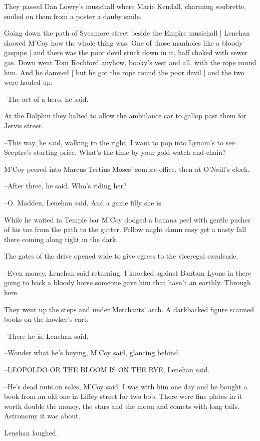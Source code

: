 They passed Dan Lowry's musichall
where Marie Kendall, charming
soubrette,
smiled on them from a poster
a dauby smile.

Going down the path of Sycamore street beside the Empire musichall |
Lenehan showed M'Coy how the whole thing was.
One of those manholes like a bloody gaspipe |
and there was the poor devil stuck down in it,
half choked with sewer gas.
Down went Tom Rochford anyhow,
booky's vest and all,
with the rope round him.
And be damned |
but he got the rope round the poor devil |
and the two were hauled up.

--The act of a hero,
he said.

At the Dolphin
they halted to allow the ambulance car to gallop past
them for Jervis street.

--This way,
he said,
walking to the right.
I want to pop into Lynam's to
see Sceptre's starting price.
What's the time by your gold watch and
chain?

M'Coy peered into Marcus Tertius Moses' sombre office,
then at
O'Neill's clock.

--After three,
he said.
Who's riding her?

--O. Madden,
Lenehan said.
And a game filly she is.

While he waited in Temple bar
M'Coy dodged a banana peel with
gentle pushes of his toe
from the path to the gutter.
Fellow might damn
easy get a nasty fall there
coming along tight in the dark.

The gates of the drive opened wide
to give egress to the viceregal
cavalcade.

--Even money,
Lenehan said returning.
I knocked against Bantam Lyons in
there
going to back a bloody horse someone gave him that hasn't an
earthly.
Through here.

They went up the steps and under Merchants' arch.
A darkbacked figure scanned books on the hawker's cart.

--There he is,
Lenehan said.

--Wonder what he's buying,
M'Coy said,
glancing behind.

--LEOPOLDO OR THE BLOOM IS ON THE RYE,
Lenehan said.

--He's dead nuts on sales,
M'Coy said.
I was with him one day
and he
bought a book from an old one in Liffey street for two bob.
There were
fine plates in it worth double the money,
the stars and the moon and
comets with long tails.
Astronomy it was about.

Lenehan laughed.

